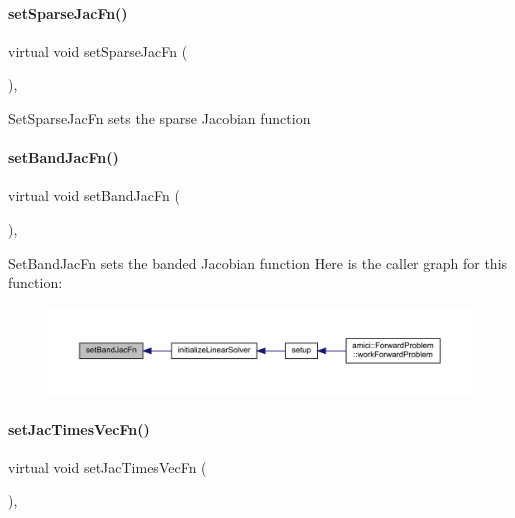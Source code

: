 \paragraph{\texorpdfstring{set\+Sparse\+Jac\+Fn()}{setSparseJacFn()}}
{\footnotesize\ttfamily virtual void set\+Sparse\+Jac\+Fn (\begin{DoxyParamCaption}{ }\end{DoxyParamCaption})\hspace{0.3cm}{\ttfamily [protected]}, {}}

Set\+Sparse\+Jac\+Fn sets the sparse Jacobian function \mbox{\label{classamici_1_1_solver_a1ac4c2c1cf9df3c478ade2b1d5e728c6}} 
\paragraph{\texorpdfstring{set\+Band\+Jac\+Fn()}{setBandJacFn()}}
{\footnotesize\ttfamily virtual void set\+Band\+Jac\+Fn (\begin{DoxyParamCaption}{ }\end{DoxyParamCaption})\hspace{0.3cm}{\ttfamily [protected]}, {}}

Set\+Band\+Jac\+Fn sets the banded Jacobian function Here is the caller graph for this function\+:
\nopagebreak
\begin{figure}[H]
\begin{center}
\leavevmode
\includegraphics[width=350pt]{classamici_1_1_solver_a1ac4c2c1cf9df3c478ade2b1d5e728c6_icgraph}
\end{center}
\end{figure}
\mbox{\label{classamici_1_1_solver_a151ebe8ad33f1e635289c869d1412375}} 
\paragraph{\texorpdfstring{set\+Jac\+Times\+Vec\+Fn()}{setJacTimesVecFn()}}
{\footnotesize\ttfamily virtual void set\+Jac\+Times\+Vec\+Fn (\begin{DoxyParamCaption}{ }\end{DoxyParamCaption})\hspace{0.3cm}{\ttfamily [protected]}, {}}

